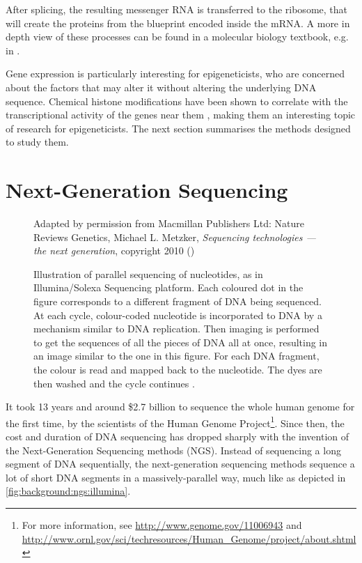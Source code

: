 \documentclass[parskip]{cs4rep}
\begin{document}
After splicing, the resulting messenger RNA is transferred to the ribosome, that will create the proteins from the blueprint encoded inside the mRNA. A more in depth view of these processes can be found in a molecular biology textbook, e.g. in \cite{Alberts:2002te}.

Gene expression is particularly interesting for epigeneticists, who are concerned about the factors that may alter it without altering the underlying DNA sequence. Chemical histone modifications have been shown to correlate with the transcriptional activity of the genes near them \cite{Pokholok:2005wn,Kouzarides:2007js}, making them an interesting topic of research for epigeneticists. The next section summarises the methods designed to study them. 
 
\section{Next-Generation Sequencing}

\begin{figure}
    \centering
    {Adapted by permission from Macmillan Publishers Ltd: Nature Reviews Genetics,
     Michael L. Metzker, \emph{Sequencing technologies — the next generation}, copyright 2010 (\cite{Metzker:j6NWuwFp})}
    \caption{Illustration of parallel sequencing of nucleotides, as in Illumina/Solexa Sequencing platform.
    Each coloured dot in the figure corresponds to a different fragment of DNA being sequenced. 
    At each cycle, colour-coded nucleotide is incorporated to DNA by a mechanism similar to DNA replication. Then imaging is performed to get the sequences of all the pieces of DNA all at once, resulting in an image similar to the one in this figure. For each DNA fragment, the colour is read and mapped back to the nucleotide. The dyes are then washed and the cycle continues \cite{Metzker:j6NWuwFp}.}
    \label{fig:background:ngs:illumina}
\end{figure}

It took 13 years and around \$2.7 billion to sequence the whole human genome for the first time, by the scientists of the Human Genome Project\footnote{For more information, see \url{http://www.genome.gov/11006943} and
    \url{http://www.ornl.gov/sci/techresources/Human_Genome/project/about.shtml}}. 
Since then, the cost and duration of DNA sequencing has dropped sharply with the invention of
the Next-Generation Sequencing methods (NGS). Instead of sequencing a long segment of DNA sequentially,
the next-generation sequencing methods sequence a lot of short DNA segments in a massively-parallel way, much like as depicted in \autoref{fig:background:ngs:illumina}.
\end{document}
